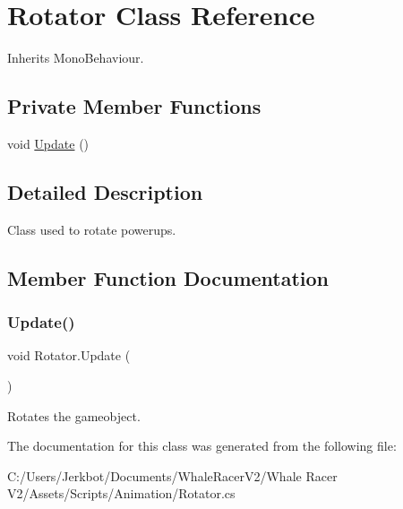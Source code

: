 \hypertarget{class_rotator}{}\section{Rotator Class Reference}
\label{class_rotator}


Inherits Mono\+Behaviour.

\subsection*{Private Member Functions}
\begin{DoxyCompactItemize}
\item 
void \hyperlink{class_rotator_a5b573a6122b39499ebd67d6db7c905e9}{Update} ()
\end{DoxyCompactItemize}


\subsection{Detailed Description}
Class used to rotate powerups. 



\subsection{Member Function Documentation}
\mbox{\label{class_rotator_a5b573a6122b39499ebd67d6db7c905e9}} 
\subsubsection{\texorpdfstring{Update()}{Update()}}
{\footnotesize\ttfamily void Rotator.\+Update (\begin{DoxyParamCaption}{ }\end{DoxyParamCaption})\hspace{0.3cm}{\ttfamily [private]}}



Rotates the gameobject. 



The documentation for this class was generated from the following file\+:\begin{DoxyCompactItemize}
\item 
C\+:/\+Users/\+Jerkbot/\+Documents/\+Whale\+Racer\+V2/\+Whale Racer V2/\+Assets/\+Scripts/\+Animation/Rotator.\+cs\end{DoxyCompactItemize}
